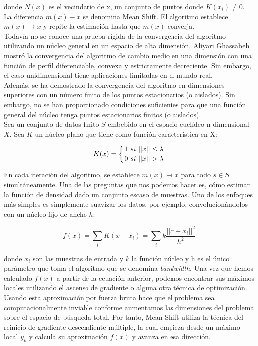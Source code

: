 \documentclass[a4paper, 20pt]{article}
\begin{document}
{donde $N(x)$ es el vecindario de x, un conjunto de puntos donde $K(x_i)\neq0$.\\

La diferencia $m(x)-x$ se denomina Mean Shift. El algoritmo establece $m(x)\rightarrow x$ y repite la estimación hasta que $m(x)$ converja.\\

Todavía no se conoce una prueba rígida de la convergencia del algoritmo utilizando un núcleo general en un espacio de alta dimensión. Aliyari Ghassabeh mostró la convergencia del algoritmo de cambio medio en una dimensión con una función de perfil diferenciable, convexa y estrictamente decreciente. Sin embargo, el caso unidimensional tiene aplicaciones limitadas en el mundo real.\\

Además, se ha demostrado la convergencia del algoritmo en dimensiones superiores con un número finito de los puntos estacionarios (o aislados). Sin embargo, no se han proporcionado condiciones suficientes para que una función general del núcleo tenga puntos estacionarios finitos (o aislados).\\

Sea un conjunto de datos finito $S$ embebido en el espacio euclídeo n-dimensional $X$. Sea $K$ un núcleo plano que tiene como función característica en X:

$$K(x)=\left\{
1 \ si \ ||x||\leq \lambda \atop
0 \ si \ ||x||> \lambda
\right.$$

En cada iteración del algoritmo, se establece $m(x)\rightarrow x$ para todo $s\in S$ simultáneamente. Una de las preguntas que nos podemos hacer es, cómo estimar la función de densidad dado un conjunto escaso de muestras. Uno de los enfoques más simples es simplemente suavizar los datos, por ejemplo, convolucionándolos con un núcleo fijo de ancho $h$:

$$f(x)=\sum_i K(x-x_i)=\sum_i k\dfrac{||x-x_i||^2}{h^2}$$

donde $x_i$ son las muestras de entrada y $k$ la función núcleo y h es el único parámetro que toma el algoritmo que se denomina \textit{bandwidth}. Una vez que hemos calculado $f(x)$ a partir de la ecuación anterior, podemos encontrar sus máximos locales utilizando el ascenso de gradiente o alguna otra técnica de optimización.\\

Usando esta aproximación por fuerza bruta hace que el problema sea computacionalmente inviable conforme aumentamos las dimensiones del problema sobre el espacio de búsqueda total. Por tanto, Mean Shift utiliza la técnica del reinicio de gradiente descendiente múltiple, la cual empieza desde un máximo local $y_k$ y calcula su aproximación $f(x)$ y avanza en esa dirección.

}
\end{document}
